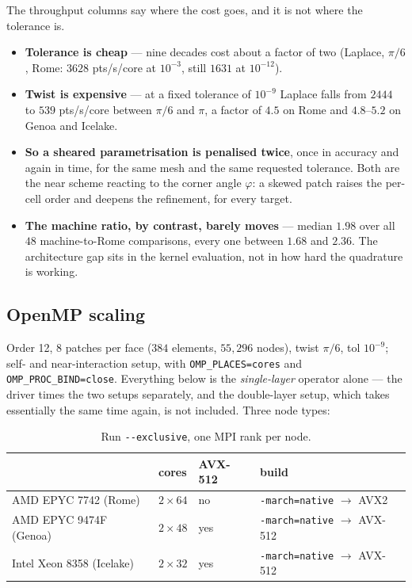 \documentclass[11pt]{article}
\begin{document}
\noindent
The throughput columns say where the cost goes, and it is not where the tolerance is.

\begin{itemize}\setlength\itemsep{1pt}
\item \textbf{Tolerance is cheap} --- nine decades cost about a factor of two (Laplace, $\pi/6$,
      Rome: $3628$ pts/s/core at $10^{-3}$, still $1631$ at $10^{-12}$).
\item \textbf{Twist is expensive} --- at a fixed tolerance of $10^{-9}$ Laplace falls from $2444$ to
      $539$ pts/s/core between $\pi/6$ and $\pi$, a factor of $4.5$ on Rome and $4.8$--$5.2$ on
      Genoa and Icelake.
\item \textbf{So a sheared parametrisation is penalised twice}, once in accuracy and again in
      time, for the same mesh and the same requested tolerance. Both are the near scheme reacting
      to the corner angle $\varphi$: a skewed patch raises the per-cell order and deepens the
      refinement, for every target.
\item \textbf{The machine ratio, by contrast, barely moves} --- median $1.98$ over all $48$
      machine-to-Rome comparisons, every one between $1.68$ and $2.36$. The architecture gap sits
      in the kernel evaluation, not in how hard the quadrature is working.
\end{itemize}

\subsection{OpenMP scaling}

Order 12, 8 patches per face ($384$ elements, $55{,}296$ nodes), twist $\pi/6$, tol $10^{-9}$;
self- and near-interaction setup, with
\texttt{OMP\_PLACES=cores} and \texttt{OMP\_PROC\_BIND=close}. Everything below is the \emph{single-layer} operator alone --- the driver times the two setups
separately, and the double-layer setup, which takes essentially the same time again, is not included. Three node types:

\begin{table}[H]\centering\small
\begin{tabular}{@{}llll@{}}
\toprule
 & cores & AVX-512 & build \\
\midrule
AMD EPYC 7742 (Rome)      & $2\times64$ & no  & \texttt{-march=native} $\to$ AVX2 \\
AMD EPYC 9474F (Genoa)    & $2\times48$ & yes & \texttt{-march=native} $\to$ AVX-512 \\
Intel Xeon 8358 (Icelake) & $2\times32$ & yes & \texttt{-march=native} $\to$ AVX-512 \\
\bottomrule
\end{tabular}
\caption{Run \texttt{-{}-exclusive}, one MPI rank per node.}
\end{table}
\end{document}
